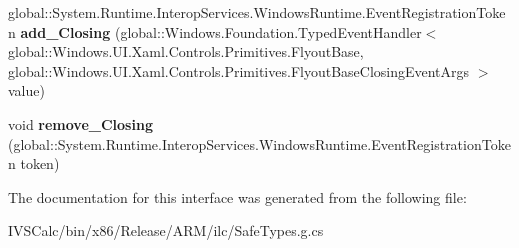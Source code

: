 \begin{DoxyCompactItemize}
\item 
\mbox{\label{interface_windows_1_1_u_i_1_1_xaml_1_1_controls_1_1_primitives_1_1_i_flyout_base2_a95eddb9c9237f55550e710d800416b2d}} 
global\+::\+System.\+Runtime.\+Interop\+Services.\+Windows\+Runtime.\+Event\+Registration\+Token {\bfseries add\+\_\+\+Closing} (global\+::\+Windows.\+Foundation.\+Typed\+Event\+Handler$<$ global\+::\+Windows.\+U\+I.\+Xaml.\+Controls.\+Primitives.\+Flyout\+Base, global\+::\+Windows.\+U\+I.\+Xaml.\+Controls.\+Primitives.\+Flyout\+Base\+Closing\+Event\+Args $>$ value)
\item 
\mbox{\label{interface_windows_1_1_u_i_1_1_xaml_1_1_controls_1_1_primitives_1_1_i_flyout_base2_a77bb61b674028f7f98f003b0694b180e}} 
void {\bfseries remove\+\_\+\+Closing} (global\+::\+System.\+Runtime.\+Interop\+Services.\+Windows\+Runtime.\+Event\+Registration\+Token token)
\end{DoxyCompactItemize}


The documentation for this interface was generated from the following file\+:\begin{DoxyCompactItemize}
\item 
I\+V\+S\+Calc/bin/x86/\+Release/\+A\+R\+M/ilc/Safe\+Types.\+g.\+cs\end{DoxyCompactItemize}
